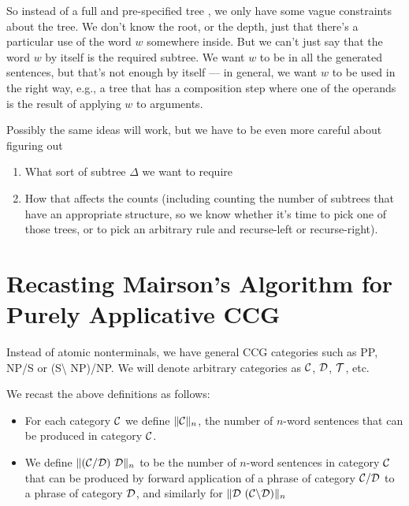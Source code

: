 \documentclass[12pt]{article}
\begin{document}
So instead of a full and pre-specified tree \Delta, we only have some vague constraints about the tree.  We don't know the root, or the depth, just that there's a particular use of the word $w$ somewhere inside. But we can't just say that the word $w$ by itself is the required subtree. We want $w$ to be in all the generated sentences, but that's not enough by itself --- in general, we want $w$ to be used in the right way, e.g., a tree that has a composition step where one of the operands is the result of applying $w$ to arguments.

Possibly the same ideas will work, but we have to be even more careful about figuring out
\begin{enumerate}
    \item What sort of subtree $\Delta$ we want to require
    \item How that affects the counts (including counting the number of subtrees
    that have an appropriate structure, so we know whether it's time to pick
    one of those trees, or to pick an arbitrary rule and recurse-left or recurse-right).
\end{enumerate}

\section{Recasting Mairson's Algorithm for Purely Applicative CCG}

\newcommand{\C}{\ensuremath{{\cal C}}}
\newcommand{\D}{\ensuremath{{\cal D}}}
\newcommand{\T}{\ensuremath{{\cal T}}}
\newcommand{\CAT}{\ensuremath{\mbox{CAT}}}
\newcommand{\LEX}{\ensuremath{\mbox{LEX}}}

Instead of atomic nonterminals, we have general CCG categories such as PP, NP/S or (S\textbackslash{} NP)/NP{}. We will denote arbitrary categories as $\C$, $\D$, $\T$, etc.


We recast the above definitions as follows:
\begin{itemize}
    \item
For each category $\C$ we define $\|\C\|_n$, the number of $n$-word sentences that can be produced in category $\C$.
\item We define $\| (\C/\D)\ \D\|_n$ to be the number of $n$-word sentences in category \(\C\) that can be produced by forward application of a phrase of category \(\C/\D\) to a phrase of category $\D$, and similarly for \(\| \D\ (\C\backslash \D)\|_n\)

\end{itemize}
\end{document}

